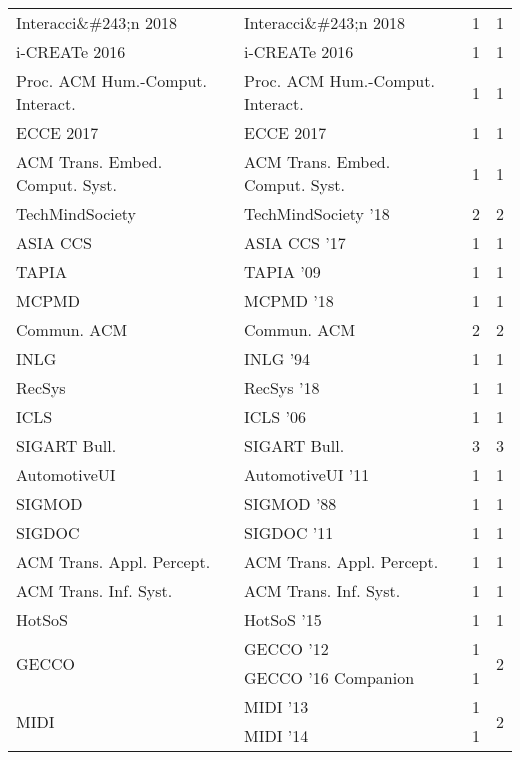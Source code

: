 \begin{table*}[t]
\begin{tabular}{llrr}
\multirow{1}{*}{Interacci\&\#243;n 2018} & Interacci\&\#243;n 2018 & 1 & \multirow{1}{*}{1}\\
\multirow{1}{*}{i-CREATe 2016} & i-CREATe 2016 & 1 & \multirow{1}{*}{1}\\
\multirow{1}{*}{Proc. ACM Hum.-Comput. Interact.} & Proc. ACM Hum.-Comput. Interact. & 1 & \multirow{1}{*}{1}\\
\multirow{1}{*}{ECCE 2017} & ECCE 2017 & 1 & \multirow{1}{*}{1}\\
\multirow{1}{*}{ACM Trans. Embed. Comput. Syst.} & ACM Trans. Embed. Comput. Syst. & 1 & \multirow{1}{*}{1}\\
\multirow{1}{*}{TechMindSociety } & TechMindSociety '18 & 2 & \multirow{1}{*}{2}\\
\multirow{1}{*}{ASIA CCS } & ASIA CCS '17 & 1 & \multirow{1}{*}{1}\\
\multirow{1}{*}{TAPIA } & TAPIA '09 & 1 & \multirow{1}{*}{1}\\
\multirow{1}{*}{MCPMD } & MCPMD '18 & 1 & \multirow{1}{*}{1}\\
\multirow{1}{*}{Commun. ACM} & Commun. ACM & 2 & \multirow{1}{*}{2}\\
\multirow{1}{*}{INLG } & INLG '94 & 1 & \multirow{1}{*}{1}\\
\multirow{1}{*}{RecSys } & RecSys '18 & 1 & \multirow{1}{*}{1}\\
\multirow{1}{*}{ICLS } & ICLS '06 & 1 & \multirow{1}{*}{1}\\
\multirow{1}{*}{SIGART Bull.} & SIGART Bull. & 3 & \multirow{1}{*}{3}\\
\multirow{1}{*}{AutomotiveUI } & AutomotiveUI '11 & 1 & \multirow{1}{*}{1}\\
\multirow{1}{*}{SIGMOD } & SIGMOD '88 & 1 & \multirow{1}{*}{1}\\
\multirow{1}{*}{SIGDOC } & SIGDOC '11 & 1 & \multirow{1}{*}{1}\\
\multirow{1}{*}{ACM Trans. Appl. Percept.} & ACM Trans. Appl. Percept. & 1 & \multirow{1}{*}{1}\\
\multirow{1}{*}{ACM Trans. Inf. Syst.} & ACM Trans. Inf. Syst. & 1 & \multirow{1}{*}{1}\\
\multirow{1}{*}{HotSoS } & HotSoS '15 & 1 & \multirow{1}{*}{1}\\
\multirow{2}{*}{GECCO } & GECCO '12 & 1 & \multirow{2}{*}{2}\\
& GECCO '16 Companion & 1 &\\
\multirow{2}{*}{MIDI } & MIDI '13 & 1 & \multirow{2}{*}{2}\\
& MIDI '14 & 1 &\\

\end{tabular}
\end{table*}
